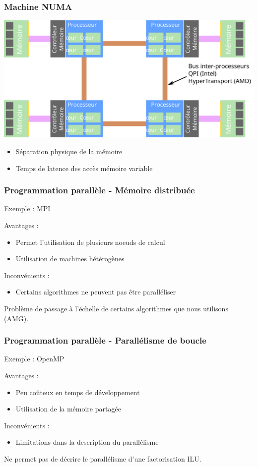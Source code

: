 \documentclass{beamer}
\begin{document}
\begin{frame}
  \frametitle{Machine NUMA}
  \centerline{\includegraphics[width=0.8\linewidth]{numa}}

  \begin{itemize}
    \item Séparation physique de la mémoire
    \item Temps de latence des accès mémoire variable
  \end{itemize}

\end{frame}




\begin{frame}
  \frametitle{Programmation parallèle - Mémoire distribuée}
  Exemple : MPI
  \bigskip

  Avantages :
  \begin{itemize}
    \item Permet l'utilisation de plusieurs noeuds de calcul
    \item Utilisation de machines hétérogènes
  \end{itemize}

  Inconvénients :
  \begin{itemize}
    \item Certains algorithmes ne peuvent pas être paralléliser
  \end{itemize}

  \bigskip
  Problème de passage à l'échelle de certains algorithmes que nous utilisons (AMG).
\end{frame}



\begin{frame}
  \frametitle{Programmation parallèle - Parallélisme de boucle}
  Exemple : OpenMP
  \bigskip

  Avantages :
  \begin{itemize}
    \item Peu coûteux en temps de développement
    \item Utilisation de la mémoire partagée
  \end{itemize}

  Inconvénients :
  \begin{itemize}
    \item Limitations dans la description du parallélisme
  \end{itemize}

  \bigskip
  Ne permet pas de décrire le parallélisme d'une factorisation ILU.
\end{frame}
\end{document}

